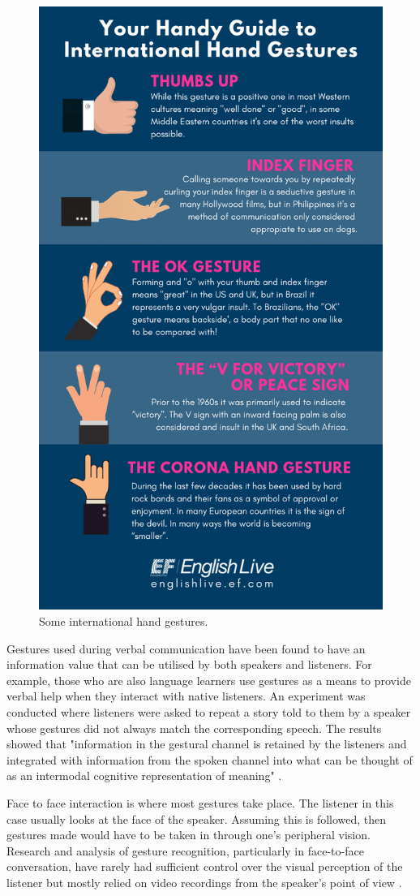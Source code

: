 \documentclass{article}
\begin{document}
\begin{figure}[H]
	\centering
	\includegraphics[width=0.6\linewidth]{images/some-hand-gestures.png}
	\caption{Some international hand gestures.}
	\label{fig:Some international hand gestures.}
\end{figure}

Gestures used during verbal communication have been found to have an information value that can be utilised by both speakers and listeners. For example, those who are also language learners use gestures as a means to provide verbal help when they interact with native listeners. An experiment was conducted where listeners were asked to repeat a story told to them by a speaker whose gestures did not always match the corresponding speech. The results showed that "information in the gestural channel is retained by the listeners and integrated with information from the spoken channel into what can be thought of as an intermodal cognitive representation of meaning" \cite{jbp:/content/journals/10.1075/pc.7.1.04gul}.

Face to face interaction is where most gestures take place. The listener in this case usually looks at the face of the speaker. Assuming this is followed, then gestures made would have to be taken in through one's peripheral vision. Research and analysis of gesture recognition, particularly in face-to-face conversation, have rarely had sufficient control over the visual perception of the listener but mostly relied on video recordings from the speaker's point of view \cite{jbp:/content/journals/10.1075/pc.7.1.04gul}.
\end{document}
